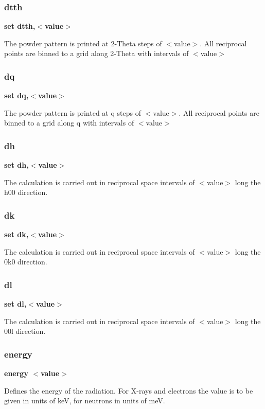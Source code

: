 \subsubsection{dtth}
{\bf set dtth,$ <$value$> $ \par }
\par
\vspace{3pt}
The powder pattern is printed at 2-Theta steps of $ <$value$> $. All reciprocal 
points are binned to a grid along 2-Theta with intervals of $ <$value$> $ 
\subsubsection{dq}
{\bf set dq,$ <$value$> $ \par }
\par
\vspace{3pt}
The powder pattern is printed at q steps of $ <$value$> $. All reciprocal 
points are binned to a grid along q with intervals of $ <$value$> $ 
\subsubsection{dh}
{\bf set dh,$ <$value$> $ \par }
\par
\vspace{3pt}
The calculation is carried out in reciprocal space intervals of 
$ <$value$> $ long the h00 direction. 
\subsubsection{dk}
{\bf set dk,$ <$value$> $ \par }
\par
\vspace{3pt}
The calculation is carried out in reciprocal space intervals of 
$ <$value$> $ long the 0k0 direction. 
\subsubsection{dl}
{\bf set dl,$ <$value$> $ \par }
\par
\vspace{3pt}
The calculation is carried out in reciprocal space intervals of 
$ <$value$> $ long the 00l direction. 
\subsubsection{energy}
{\bf energy $ <$value$> $ \par }
\par
\vspace{3pt}
Defines the energy of the radiation. 
For X-rays and electrons the value is to be given in units of keV, 
for neutrons in units of meV. 
